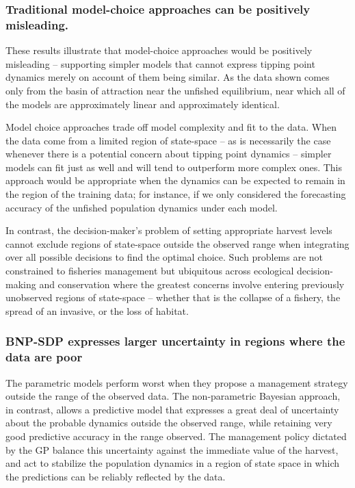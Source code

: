 \documentclass[author-year, review]{elsarticle} %
\begin{document}
\subsubsection{Traditional model-choice approaches can be positively
misleading.}\label{traditional-model-choice-approaches-can-be-positively-misleading.}

These results illustrate that model-choice approaches would be
positively misleading -- supporting simpler models that cannot express
tipping point dynamics merely on account of them being similar. As the
data shown comes only from the basin of attraction near the unfished
equilibrium, near which all of the models are approximately linear and
approximately identical.

Model choice approaches trade off model complexity and fit to the data.
When the data come from a limited region of state-space -- as is
necessarily the case whenever there is a potential concern about tipping
point dynamics -- simpler models can fit just as well and will tend to
outperform more complex ones. This approach would be appropriate when
the dynamics can be expected to remain in the region of the training
data; for instance, if we only considered the forecasting accuracy of
the unfished population dynamics under each model.

In contrast, the decision-maker's problem of setting appropriate harvest
levels cannot exclude regions of state-space outside the observed range
when integrating over all possible decisions to find the optimal choice.
Such problems are not constrained to fisheries management but ubiquitous
across ecological decision-making and conservation where the greatest
concerns involve entering previously unobserved regions of state-space
-- whether that is the collapse of a fishery, the spread of an invasive,
or the loss of habitat.

\subsubsection{BNP-SDP expresses larger uncertainty in regions where the
data are
poor}\label{bnp-sdp-expresses-larger-uncertainty-in-regions-where-the-data-are-poor}

The parametric models perform worst when they propose a management
strategy outside the range of the observed data. The non-parametric
Bayesian approach, in contrast, allows a predictive model that expresses
a great deal of uncertainty about the probable dynamics outside the
observed range, while retaining very good predictive accuracy in the
range observed. The management policy dictated by the GP balance this
uncertainty against the immediate value of the harvest, and act to
stabilize the population dynamics in a region of state space in which
the predictions can be reliably reflected by the data.
\end{document}
